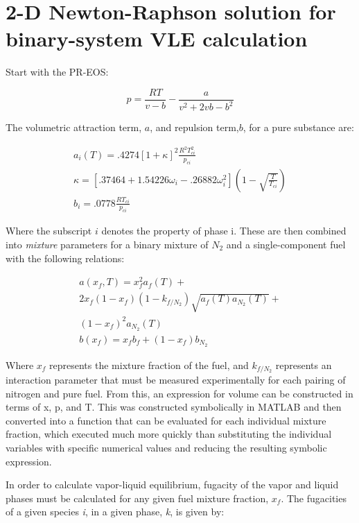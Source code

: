 \documentclass[a4paper, twocolumn]{article}
\begin{document}
\section{2-D Newton-Raphson solution for binary-system VLE calculation}

Start with the PR-EOS:

\begin{equation}
p = \frac{RT}{v-b} - \frac{a}{v^2 +2vb -b^2}
\end{equation}

The volumetric attraction term, $a$, and repulsion term,$b$, for a pure substance are:

\begin{gather}
a_i(T) = .4274\left[1  + \kappa \right]^2\frac{R^2 T_{ci}^2}{p_{ci}}\\
\kappa = \left[.37464 + 1.54226\omega_i -  .26882\omega_i^2\right]
\left(1-\sqrt{\frac{T}{T_{ci}}}\right)\nonumber\\
b_i = .0778\frac{R T_{ci}}{p_{ci}}
\end{gather}

Where the subscript $i$ denotes the property of phase i. These are then combined into \emph{mixture} parameters for a binary mixture of $N_2$ and a single-component fuel with the following relations:

\begin{gather}
a(x_f, T) = x_f^2a_f(T)  + \nonumber \\
2x_f (1-x_f) (1-k_{f/N_2})\sqrt{a_f(T)  a_{N_2}(T) } + \nonumber\\
(1-x_f)^2 a_{N_2}(T) \\
b(x_f) = x_f b_f + (1-x_f)  b_{N_2} 
\end{gather}


Where $x_f$ represents the mixture fraction of the fuel, and $k_{f/N_2}$ represents an interaction parameter that must be measured experimentally for each pairing of nitrogen and pure fuel. From this, an  expression for volume can be constructed in terms of x, p, and T. This was constructed symbolically in MATLAB and then converted into a function that can be evaluated for each individual mixture fraction, which executed much more quickly than substituting the individual variables with specific numerical values and reducing the resulting symbolic expression.

In order to calculate vapor-liquid equilibrium, fugacity of the vapor and liquid phases must be calculated for any given fuel mixture fraction, $x_f$. The fugacities of a given species \emph{i}, in a given phase, \emph{k}, is given by:
\end{document}
